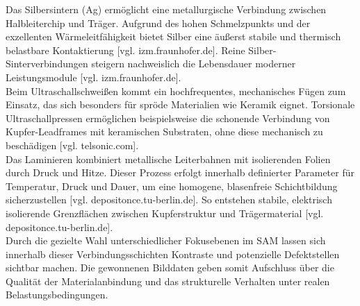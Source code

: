 Das Silbersintern (Ag) ermöglicht eine metallurgische Verbindung zwischen Halbleiterchip und Träger. Aufgrund des hohen Schmelzpunkts und der exzellenten Wärmeleitfähigkeit bietet Silber eine äußerst stabile und thermisch belastbare Kontaktierung [vgl. izm.fraunhofer.de]. Reine Silber-Sinterverbindungen steigern nachweislich die Lebensdauer moderner Leistungsmodule [vgl. izm.fraunhofer.de].\\

Beim Ultraschallschweißen kommt ein hochfrequentes, mechanisches Fügen zum Einsatz, das sich besonders für spröde Materialien wie Keramik eignet. Torsionale Ultraschallpressen ermöglichen beispielsweise die schonende Verbindung von Kupfer-Leadframes mit keramischen Substraten, ohne diese mechanisch zu beschädigen [vgl. telsonic.com].\\

Das Laminieren kombiniert metallische Leiterbahnen mit isolierenden Folien durch Druck und Hitze. Dieser Prozess erfolgt innerhalb definierter Parameter für Temperatur, Druck und Dauer, um eine homogene, blasenfreie Schichtbildung sicherzustellen [vgl. depositonce.tu-berlin.de]. So entstehen stabile, elektrisch isolierende Grenzflächen zwischen Kupferstruktur und Trägermaterial [vgl. depositonce.tu-berlin.de].\\

Durch die gezielte Wahl unterschiedlicher Fokusebenen im SAM lassen sich innerhalb dieser Verbindungsschichten Kontraste und potenzielle Defektstellen sichtbar machen. Die gewonnenen Bilddaten geben somit Aufschluss über die Qualität der Materialanbindung und das strukturelle Verhalten unter realen Belastungsbedingungen.